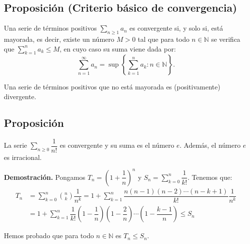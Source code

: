\documentclass[10pt,a4paper]{article}
\begin{document}
	\subsection{Proposición (Criterio básico de convergencia)}
	
	Una serie de términos positivos $\displaystyle\sum_{n \geq 1} a_n$ es convergente si, y solo si, está mayorada, es decir, existe un número $M > 0$ tal que para todo $n \in \mathbb{N}$ se verifica que $\displaystyle\sum_{k = 1} ^n a_k \leq M$, en cuyo caso su suma viene dada por: 
	$$ \sum_{n = 1} ^ \infty a_n = \sup \left\{\sum_{k = 1}^n a_k : n \in \mathbb{N}\right\}.$$
	
	Una serie de términos positivos que no está mayorada es (positivamente) divergente.
	
	\subsection{Proposición}
	La serie $\displaystyle\sum_{n \geq 0} \dfrac{1}{n!}$ es convergente y su suma es el número $e$. Además, el número $e$ es irracional.
	
	\textbf{Demostración. }Pongamos $T_n = \left(1 + \dfrac{1}{n}\right) ^n$ y $\displaystyle S_n = \sum_{k = 0} ^n \dfrac{1}{k!}$. Tenemos que:
	\begin{equation*}
		\begin{split}
			T_n & = \sum_{k = 0} ^n {n \choose k} \dfrac{1}{n^k} = 1 + \sum_{k = 1}^n \dfrac{n(n-1)(n-2)\cdots(n-k+1)}{k!} \dfrac{1}{n^k} \\
			& = 1 + \sum_{k = 1} ^n \dfrac{1}{k!} \left(1 - \dfrac{1}{n}\right) \left(1 - \dfrac{2}{n}\right) \cdots \left(1 - \dfrac{k-1}{n}\right) \leq S_n
		\end{split}
	\end{equation*}

	Hemos probado que para todo $n \in \mathbb{N}$ es $T_n \leq S_n$.
	
\end{document}
